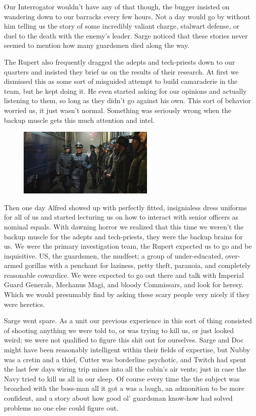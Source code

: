 Our Interrogator wouldn't have any of that though, the bugger insisted on wandering down to our barracks every few hours. 
Not a day would go by without him telling us the story of some incredibly valiant charge, stalwart defense, or duel to the death with the enemy's leader. 
Sarge noticed that these stories never seemed to mention how many guardsmen died along the way.

The Rupert also frequently dragged the adepts and tech-priests down to our quarters and insisted they brief us on the results of their research. 
At first we dismissed this as some sort of misguided attempt to build camaraderie in the team, but he kept doing it. 
He even started asking for our opinions and actually listening to them, so long as they didn't go against his own. 
This sort of behavior worried us, it just wasn't normal. 
Something was seriously wrong when the backup muscle gets this much attention and intel.

\begin{figure}
	\begin{center}
		\includegraphics[width=\figwidth]{pics/4/6.png}
	\end{center}
\end{figure}
Then one day Alfred showed up with perfectly fitted, insignialess dress uniforms for all of us and started lecturing us on how to interact with senior officers as nominal equals. 
With dawning horror we realized that this time we weren't the backup muscle for the adepts and tech-priests, they were the backup brains for us. 
We were the primary investigation team, the Rupert expected us to go and be inquisitive. US, the guardsmen, the mudfeet; a group of under-educated, over-armed gorillas with a penchant for laziness, petty theft, paranoia, and completely reasonable cowardice. 
We were expected to go out there and talk with Imperial Guard Generals, Mechanus Magi, and bloody Commissars, and look for heresy. 
Which we would presumably find by asking these scary people very nicely if they were heretics.

Sarge went spare. 
As a unit our previous experience in this sort of thing consisted of shooting anything we were told to, or was trying to kill us, or just looked weird; we were not qualified to figure this shit out for ourselves. 
Sarge and Doc might have been reasonably intelligent within their fields of expertise, but Nubby was a cretin and a thief, Cutter was borderline psychotic, and Twitch had spent the last few days wiring trip mines into all the cabin's air vents;
 just in case the Navy tried to kill us all in our sleep. 
Of course every time the the subject was broached with the boss-man all it got a was a laugh, an admonition to be more confident, and a story about how good ol' guardsman know-how had solved problems no one else could figure out.

